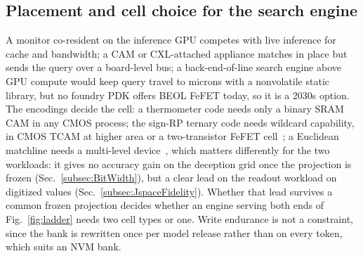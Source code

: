 \documentclass[conference]{IEEEtran}
\newcommand{\cam}{{CAM}\xspace}
\newcommand{\tcam}{{TCAM}\xspace}
\newcommand{\fefet}{{FeFET}\xspace}
\newcommand{\signrp}{{sign-RP}\xspace}
\begin{document}
\subsection{Placement and cell choice for the search engine}
\label{subsec:Placement}
\label{subsec:Devices}
A monitor co-resident on the inference GPU competes with live
inference for cache and bandwidth; a \cam or CXL-attached appliance
matches in place but sends the query over a board-level bus; a
back-end-of-line search engine above GPU compute would keep query travel
to microns with a
nonvolatile static library, but no foundry PDK offers BEOL \fefet
today, so it is a 2030s option.
The encodings decide the cell: a thermometer code needs only a
binary SRAM \cam in any CMOS process; the \signrp ternary code needs
wildcard capability, in CMOS \tcam at higher area or a two-transistor
\fefet cell~\cite{ni2019fetcam}; a Euclidean matchline needs a
multi-level device~\cite{kazemi2021fefetcam}, which matters
differently for the two workloads: it gives no accuracy gain on the
deception grid once the projection is frozen
(Sec.~\ref{subsec:BitWidth}), but a clear lead on the readout
workload on digitized values (Sec.~\ref{subsec:JspaceFidelity}).
Whether that lead survives a common frozen projection decides whether an engine
serving both ends of Fig.~\ref{fig:ladder} needs two cell types or
one. Write endurance is not a constraint, since the bank is
rewritten once per model release rather than on every token, which
suits an NVM bank.
\end{document}

